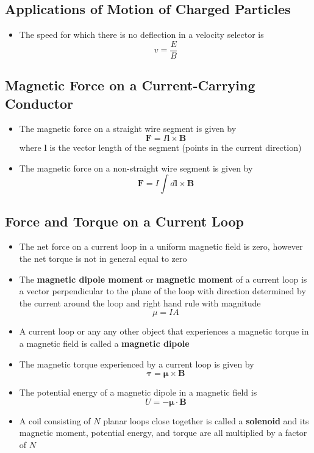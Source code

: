 \documentclass{article}
\begin{document}
\subsection{Applications of Motion of Charged Particles}

\begin{itemize}
  \item The speed for which there is no deflection in a velocity selector is \[v = \frac{E}{B}\]
\end{itemize}

\subsection{Magnetic Force on a Current-Carrying Conductor}

\begin{itemize}
  \item The magnetic force on a straight wire segment is given by \[\mathbf{F} = I \mathbf{l} \times \mathbf{B}\] where $\mathbf{l}$ is the vector length of the segment (points in the current direction)

  \item The magnetic force on a non-straight wire segment is given by \[\mathbf{F} = I \int d\mathbf{l} \times \mathbf{B}\]
\end{itemize}

\subsection{Force and Torque on a Current Loop}

\begin{itemize}
  \item The net force on a current loop in a uniform magnetic field is zero, however the net torque is not in general equal to zero

  \item The \textbf{magnetic dipole moment} or \textbf{magnetic moment} of a current loop is a vector perpendicular to the plane of the loop with direction determined by the current around the loop and right hand rule with magnitude \[\mu = I A\]

  \item A current loop or any any other object that experiences a magnetic torque in a magnetic field is called a \textbf{magnetic dipole}

  \item The magnetic torque experienced by a current loop is given by \[\boldsymbol{\tau} = \boldsymbol{\mu} \times \mathbf{B}\]

  \item The potential energy of a magnetic dipole in a magnetic field is \[U = -\boldsymbol{\mu} \cdot \mathbf{B}\]

  \item A coil consisting of $N$ planar loops close together is called a \textbf{solenoid} and its magnetic moment, potential energy, and torque are all multiplied by a factor of $N$
\end{itemize}
\end{document}
